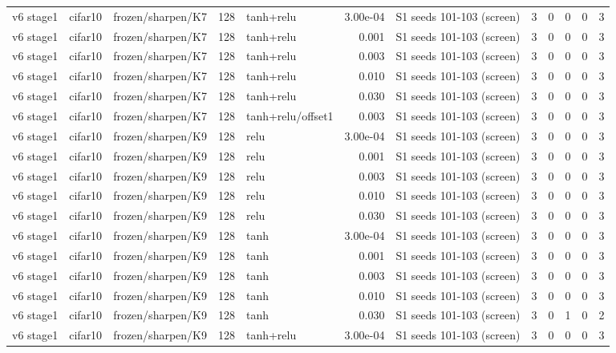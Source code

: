 \begin{table}[htbp]
{\begin{tabular}{@{}lllrlrlrrrrr@{}}
v6 stage1 & cifar10 & frozen/sharpen/K7 & 128 & tanh+relu & 3.00e-04 & S1 seeds 101-103 (screen) & 3 & 0 & 0 & 0 & 3 \\
v6 stage1 & cifar10 & frozen/sharpen/K7 & 128 & tanh+relu & 0.001 & S1 seeds 101-103 (screen) & 3 & 0 & 0 & 0 & 3 \\
v6 stage1 & cifar10 & frozen/sharpen/K7 & 128 & tanh+relu & 0.003 & S1 seeds 101-103 (screen) & 3 & 0 & 0 & 0 & 3 \\
v6 stage1 & cifar10 & frozen/sharpen/K7 & 128 & tanh+relu & 0.010 & S1 seeds 101-103 (screen) & 3 & 0 & 0 & 0 & 3 \\
v6 stage1 & cifar10 & frozen/sharpen/K7 & 128 & tanh+relu & 0.030 & S1 seeds 101-103 (screen) & 3 & 0 & 0 & 0 & 3 \\
v6 stage1 & cifar10 & frozen/sharpen/K7 & 128 & tanh+relu/offset1 & 0.003 & S1 seeds 101-103 (screen) & 3 & 0 & 0 & 0 & 3 \\
v6 stage1 & cifar10 & frozen/sharpen/K9 & 128 & relu & 3.00e-04 & S1 seeds 101-103 (screen) & 3 & 0 & 0 & 0 & 3 \\
v6 stage1 & cifar10 & frozen/sharpen/K9 & 128 & relu & 0.001 & S1 seeds 101-103 (screen) & 3 & 0 & 0 & 0 & 3 \\
v6 stage1 & cifar10 & frozen/sharpen/K9 & 128 & relu & 0.003 & S1 seeds 101-103 (screen) & 3 & 0 & 0 & 0 & 3 \\
v6 stage1 & cifar10 & frozen/sharpen/K9 & 128 & relu & 0.010 & S1 seeds 101-103 (screen) & 3 & 0 & 0 & 0 & 3 \\
v6 stage1 & cifar10 & frozen/sharpen/K9 & 128 & relu & 0.030 & S1 seeds 101-103 (screen) & 3 & 0 & 0 & 0 & 3 \\
v6 stage1 & cifar10 & frozen/sharpen/K9 & 128 & tanh & 3.00e-04 & S1 seeds 101-103 (screen) & 3 & 0 & 0 & 0 & 3 \\
v6 stage1 & cifar10 & frozen/sharpen/K9 & 128 & tanh & 0.001 & S1 seeds 101-103 (screen) & 3 & 0 & 0 & 0 & 3 \\
v6 stage1 & cifar10 & frozen/sharpen/K9 & 128 & tanh & 0.003 & S1 seeds 101-103 (screen) & 3 & 0 & 0 & 0 & 3 \\
v6 stage1 & cifar10 & frozen/sharpen/K9 & 128 & tanh & 0.010 & S1 seeds 101-103 (screen) & 3 & 0 & 0 & 0 & 3 \\
v6 stage1 & cifar10 & frozen/sharpen/K9 & 128 & tanh & 0.030 & S1 seeds 101-103 (screen) & 3 & 0 & 1 & 0 & 2 \\
v6 stage1 & cifar10 & frozen/sharpen/K9 & 128 & tanh+relu & 3.00e-04 & S1 seeds 101-103 (screen) & 3 & 0 & 0 & 0 & 3 \\

\end{tabular}}
\end{table}
